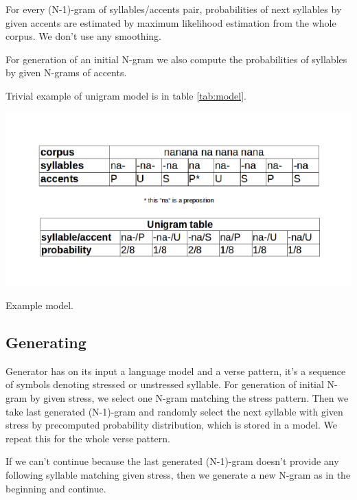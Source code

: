 \documentclass[a4]{article}
\begin{document}
For every (N-1)-gram of syllables/accents pair, probabilities of next
syllables by given accents are estimated by maximum likelihood estimation
from the whole corpus. We don't use any smoothing. 

For generation of an initial N-gram we also compute the probabilities of
syllables by given N-grams of accents.


Trivial example of unigram model is in table \ref{tab:model}.

\begin{table}[ht]
\centerline{
	\includegraphics{corpus.pdf}
}
\caption{Example model.
}
\label{tab:model}
\end{table}




\subsection{Generating}

Generator has on its input a language model and a verse pattern, it's a sequence of symbols
denoting stressed or unstressed syllable. For generation of initial N-gram
by given stress, we select one N-gram matching the stress pattern. Then we
take last generated (N-1)-gram and randomly select the next syllable with given
stress by precomputed probability distribution, which is stored in a model.
We repeat this for the whole verse pattern.

If we can't continue because the last generated (N-1)-gram doesn't provide any
following syllable matching given stress, then we generate a new N-gram as
in the beginning and continue.
\end{document}
